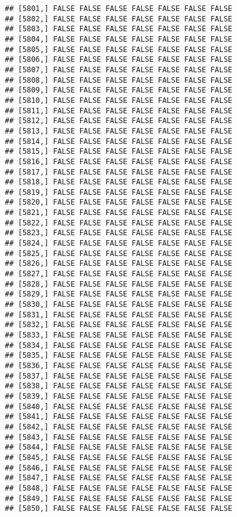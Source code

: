 \documentclass[
]{article}
\begin{document}
\begin{verbatim}
## [5801,] FALSE FALSE FALSE FALSE FALSE FALSE FALSE
## [5802,] FALSE FALSE FALSE FALSE FALSE FALSE FALSE
## [5803,] FALSE FALSE FALSE FALSE FALSE FALSE FALSE
## [5804,] FALSE FALSE FALSE FALSE FALSE FALSE FALSE
## [5805,] FALSE FALSE FALSE FALSE FALSE FALSE FALSE
## [5806,] FALSE FALSE FALSE FALSE FALSE FALSE FALSE
## [5807,] FALSE FALSE FALSE FALSE FALSE FALSE FALSE
## [5808,] FALSE FALSE FALSE FALSE FALSE FALSE FALSE
## [5809,] FALSE FALSE FALSE FALSE FALSE FALSE FALSE
## [5810,] FALSE FALSE FALSE FALSE FALSE FALSE FALSE
## [5811,] FALSE FALSE FALSE FALSE FALSE FALSE FALSE
## [5812,] FALSE FALSE FALSE FALSE FALSE FALSE FALSE
## [5813,] FALSE FALSE FALSE FALSE FALSE FALSE FALSE
## [5814,] FALSE FALSE FALSE FALSE FALSE FALSE FALSE
## [5815,] FALSE FALSE FALSE FALSE FALSE FALSE FALSE
## [5816,] FALSE FALSE FALSE FALSE FALSE FALSE FALSE
## [5817,] FALSE FALSE FALSE FALSE FALSE FALSE FALSE
## [5818,] FALSE FALSE FALSE FALSE FALSE FALSE FALSE
## [5819,] FALSE FALSE FALSE FALSE FALSE FALSE FALSE
## [5820,] FALSE FALSE FALSE FALSE FALSE FALSE FALSE
## [5821,] FALSE FALSE FALSE FALSE FALSE FALSE FALSE
## [5822,] FALSE FALSE FALSE FALSE FALSE FALSE FALSE
## [5823,] FALSE FALSE FALSE FALSE FALSE FALSE FALSE
## [5824,] FALSE FALSE FALSE FALSE FALSE FALSE FALSE
## [5825,] FALSE FALSE FALSE FALSE FALSE FALSE FALSE
## [5826,] FALSE FALSE FALSE FALSE FALSE FALSE FALSE
## [5827,] FALSE FALSE FALSE FALSE FALSE FALSE FALSE
## [5828,] FALSE FALSE FALSE FALSE FALSE FALSE FALSE
## [5829,] FALSE FALSE FALSE FALSE FALSE FALSE FALSE
## [5830,] FALSE FALSE FALSE FALSE FALSE FALSE FALSE
## [5831,] FALSE FALSE FALSE FALSE FALSE FALSE FALSE
## [5832,] FALSE FALSE FALSE FALSE FALSE FALSE FALSE
## [5833,] FALSE FALSE FALSE FALSE FALSE FALSE FALSE
## [5834,] FALSE FALSE FALSE FALSE FALSE FALSE FALSE
## [5835,] FALSE FALSE FALSE FALSE FALSE FALSE FALSE
## [5836,] FALSE FALSE FALSE FALSE FALSE FALSE FALSE
## [5837,] FALSE FALSE FALSE FALSE FALSE FALSE FALSE
## [5838,] FALSE FALSE FALSE FALSE FALSE FALSE FALSE
## [5839,] FALSE FALSE FALSE FALSE FALSE FALSE FALSE
## [5840,] FALSE FALSE FALSE FALSE FALSE FALSE FALSE
## [5841,] FALSE FALSE FALSE FALSE FALSE FALSE FALSE
## [5842,] FALSE FALSE FALSE FALSE FALSE FALSE FALSE
## [5843,] FALSE FALSE FALSE FALSE FALSE FALSE FALSE
## [5844,] FALSE FALSE FALSE FALSE FALSE FALSE FALSE
## [5845,] FALSE FALSE FALSE FALSE FALSE FALSE FALSE
## [5846,] FALSE FALSE FALSE FALSE FALSE FALSE FALSE
## [5847,] FALSE FALSE FALSE FALSE FALSE FALSE FALSE
## [5848,] FALSE FALSE FALSE FALSE FALSE FALSE FALSE
## [5849,] FALSE FALSE FALSE FALSE FALSE FALSE FALSE
## [5850,] FALSE FALSE FALSE FALSE FALSE FALSE FALSE

\end{verbatim}
\end{document}
